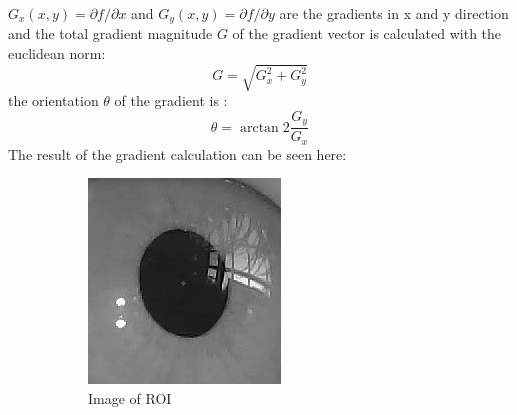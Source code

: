     $G_x(x,y) = \partial f/ \partial x$ and $G_y(x,y)= \partial f/ \partial y$ are the gradients in x and y direction and the total gradient magnitude $G$ of the gradient vector is calculated with the euclidean norm: 
    \begin{equation}
        G = \sqrt{G_x^2 + G_y^2}
        \label{eq:gradientmagnitude}
    \end{equation} 
    the orientation $\theta$ of the gradient is :
    \begin{equation}
        \theta = \arctan2{\frac{G_y}{G_x}}
        \label{eq:gradientdirection}
    \end{equation}
    The result of the gradient calculation can be seen here:
    \begin{figure}[ht]
        \centering
        \begin{subfigure}{.33\textwidth}
          \centering
          \includegraphics[width=.9\linewidth]{plots/eye_dataset/roi.png}
          \caption{Image of ROI}
          \label{fig:roig}
        \end{subfigure}%
        \begin{subfigure}{.33\textwidth}
          \centering

\end{subfigure}
\end{figure}
